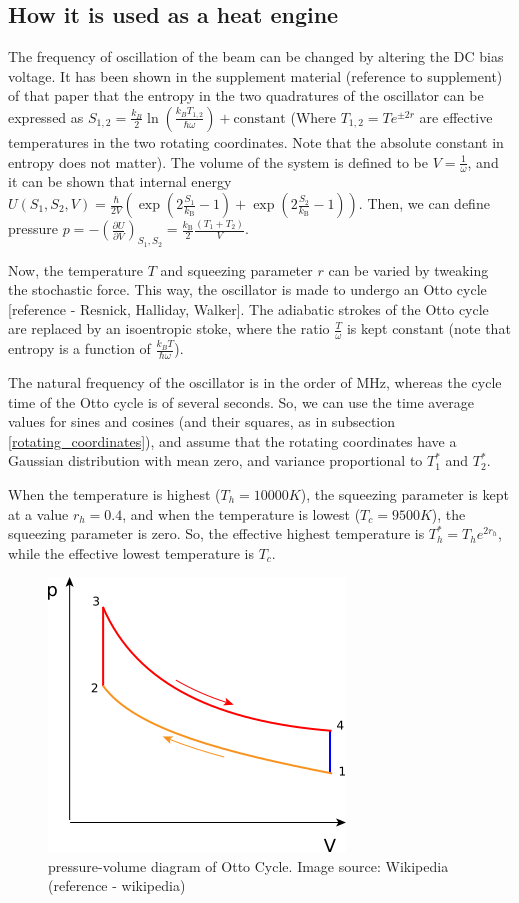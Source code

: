 \documentclass[12pt, twoside]{article}
\begin{document}
\subsection{How it is used as a heat engine}
The frequency of oscillation of the beam can be changed by altering the DC bias voltage. It has been shown in the supplement material (reference to supplement) of that paper that the entropy in the two quadratures of the oscillator can be expressed as $S_{1,2} = \frac{k_B}{2} \ln (\frac{k_B T_{1,2}}{\hbar \omega}) + \text{constant}$ (Where $T_{1,2} = T e^{\pm 2r}$ are effective temperatures in the two rotating coordinates. Note that the absolute constant in entropy does not matter). The volume of the system is defined to be $V = \frac{1}{\omega}$, and it can be shown that internal energy $U \left( S _ { 1 } , S _ { 2 } , V \right) = \frac { \hbar } { 2 V } \left( \exp \left( 2 \frac{S _ { 1 }} { k _ { \mathrm { B } }} - 1 \right) + \exp \left( 2 \frac{S _ { 2 }} { k _ { \mathrm { B } }} - 1 \right) \right)$. Then, we can define pressure $p = - \left( \frac { \partial U } { \partial V } \right) _ { S _ { 1 } , S _ { 2 } } = \frac { k _ { \mathrm { B } } } { 2 } \frac { \left( T _ { 1 } + T _ { 2 } \right) } { V }$.

Now, the temperature $T$ and squeezing parameter $r$ can be varied by tweaking the stochastic force. This way, the oscillator is made to undergo an Otto cycle [reference - Resnick, Halliday, Walker]. The adiabatic strokes of the Otto cycle are replaced by an isoentropic stoke, where the ratio $\frac{T}{\omega}$ is kept constant (note that entropy is a function of $\frac{k_B T}{\hbar \omega}$).

The natural frequency of the oscillator is in the order of MHz, whereas the cycle time of the Otto cycle is of several seconds. So, we can use the time average values for sines and cosines (and their squares, as in subsection \ref{rotating_coordinates}), and assume that the rotating coordinates have a Gaussian distribution with mean zero, and variance proportional to $T^*_1$ and $T^*_2$.

When the temperature is highest ($T_h = 10000 K$), the squeezing parameter is kept at a value $r_h = 0.4$, and when the temperature is lowest ($T_c = 9500 K$), the squeezing parameter is zero. So, the effective highest temperature is $T^*_h = T_h e^{2r_h}$, while the effective lowest temperature is $T_c$.

\begin{figure}[h!]
	\centering
	\includegraphics[width=0.4\linewidth]{graphs/P-V_Otto_cycle.png}
	\caption{pressure-volume diagram of Otto Cycle. Image source: Wikipedia (reference - wikipedia)}
	\label{fig:Otto_cycle}
\end{figure}
\end{document}
